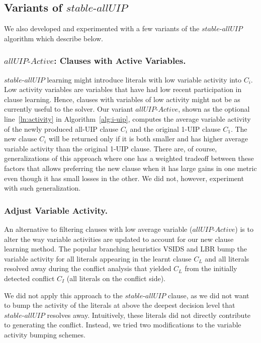 \documentclass[runningheads]{llncs}
\newcommand{\allUip}{\textit{stable-allUIP}}
\newcommand{\allUipAct}{\textit{allUIP-Active}}
\begin{document}
\subsection{Variants of $\allUip$}
We also developed and experimented with a few variants of the
$\allUip$ algorithm which describe below.

\subsubsection{$\allUipAct$: Clauses with Active
  Variables.} \label{sec:active} $\allUip$ learning might introduce
literals with low variable activity into $C_i$. Low activity variables
are variables that have had low recent participation in clause
learning. Hence, clauses with variables of low activity might not be
as currently useful to the solver. Our variant $\allUipAct$, shown as
the optional line~\ref{ln:activity} in Algorithm~\ref{alg:i-uip},
computes the average variable activity of the newly produced all-UIP
clause $C_i$ and the original 1-UIP clause $C_1$. The new clause $C_i$
will be returned only if it is both smaller and has higher average
variable activity than the original 1-UIP clause. There are, of
course, generalizations of this approach where one has a weighted
tradeoff between these factors that allows preferring the new clause
when it has large gains in one metric even though it has small losses
in the other. We did not, however, experiment with such
generalization.

\subsubsection{Adjust Variable Activity.} \label{sec: varajust} An
alternative to filtering clauses with low average variable
($\allUipAct$) is to alter the way variable activities are updated to
account for our new clause learning method. The popular branching
heuristics VSIDS \cite{DBLP:conf/dac/MoskewiczMZZM01} and LBR
\cite{DBLP:conf/sat/LiangGPC16} bump the variable activity for all
literals appearing in the learnt clause $C_L$ and all literals
resolved away during the conflict analysis that yielded $C_L$ from the
initially detected conflict $C_I$ (all literals on the conflict side).

We did not apply this approach to the $\allUip$ clause, as we did not
want to bump the activity of the literals at above the deepest
decision level that $\allUip$ resolves away. Intuitively, these
literals did not directly contribute to generating the
conflict. Instead, we tried two modifications to the variable activity
bumping schemes.
\end{document}
